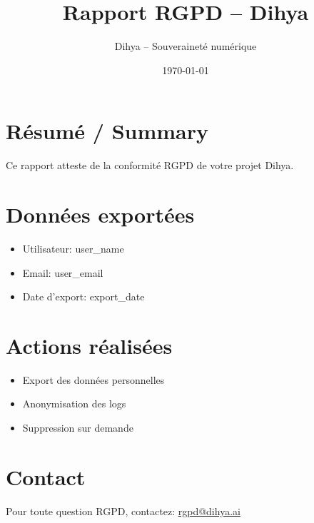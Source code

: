 \documentclass[12pt,a4paper]{article}
\title{Rapport RGPD – Dihya}
\author{Dihya – Souveraineté numérique}
\date{\today}
\begin{document}
\maketitle
\section*{Résumé / Summary}
Ce rapport atteste de la conformité RGPD de votre projet Dihya.

\section*{Données exportées}
\begin{itemize}
  \item Utilisateur: {{ user_name }}
  \item Email: {{ user_email }}
  \item Date d’export: {{ export_date }}
\end{itemize}

\section*{Actions réalisées}
\begin{itemize}
  \item Export des données personnelles
  \item Anonymisation des logs
  \item Suppression sur demande
\end{itemize}

\section*{Contact}
Pour toute question RGPD, contactez: \href{mailto:rgpd@dihya.ai}{rgpd@dihya.ai}
\end{document}
